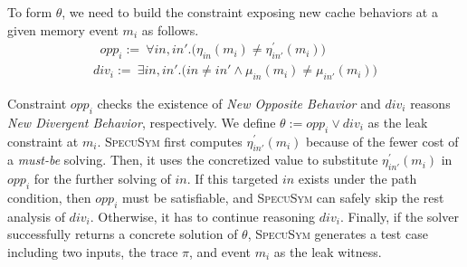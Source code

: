 \documentclass[sigconf,screen]{acmart}
\newcommand\ignore[1]{}
\newcommand{\SpecuSym}{\textsc{SpecuSym} }
\begin{document}
To form $\theta$, we need to build the constraint exposing new cache behaviors
at a given memory event $\mathit{m_i}$ as follows.
%
\begin{multline}
  \label{eqn:new_opp}
  ~~~~~~~
  \mathit{opp_i}:=~
  \forall\mathit{in,in'}.
  \big(
  \mathit{\eta_{in}(m_i)\neq\eta_{in'}^\prime(m_i)}
  \big)
  ~~~~~~~~~~~~~~~~~~~~~~~
\end{multline}
%
\begin{multline}
  \label{eqn:new_div}
  ~~~~~~~
  \mathit{div_i}:=~
  \exists\mathit{in,in'}.
  \big(
  \mathit{in\neq in'\wedge\mu_{in}(m_i) \neq \mu_{in'}(m_i)}
  \big)
  ~~~~~~~
\end{multline}
%
%
\ignore{
%
\begin{multline}
  \label{eqn:leak}
  ~~
  \theta:=
  \Big(
  \mathit{div_i}
  \wedge
  \big(
  \sum_{\scriptscriptstyle \mathit{k=0}}^{\scriptscriptstyle\mathit{n}} 
  \mathit{\eta_{in''}(m_k)=}0
  \neq
  \sum_{\scriptscriptstyle \mathit{k=0}}^{\scriptscriptstyle\mathit{n}} 
  \mathit{\eta_{in''}(m_k)=}1
  \big)
  \Big)
  \vee 
  \mathit{opp_i}
  ~~
\end{multline}
%
}
%
\ignore{
Note that 
speculative execution not only evicts cache lines to cause new misses but also loads 
memory data into cache that benefits new hits. Since a leak refers to the noticeable 
timing variance in program runs with and without speculative execution, from 
$\mathit{opp_i}$ the amount of new misses should differ from the amount of new hits. 
And we construct the final leak constraint $\theta$ on this observation:
}
%
%
Constraint $\mathit{opp_i}$ checks the existence of \textit{New Opposite Behavior}
and $\mathit{div_i}$ reasons \textit{New Divergent Behavior}, respectively. We 
define $\theta:=\mathit{opp_i}\vee\mathit{div_i}$ as the leak 
constraint at $\mathit{m_i}$. \SpecuSym first computes 
$\mathit{\eta_{in'}^\prime(m_i)}$ because of the fewer cost of a \textit{must-be} 
solving. Then, it uses the concretized value to substitute 
$\mathit{\eta_{in'}^\prime(m_i)}$ in $\mathit{opp_i}$ for the further solving
of $\mathit{in}$. If this targeted $\mathit{in}$ exists under the path condition, 
then $opp_i$ must be satisfiable, and \SpecuSym can safely skip the rest analysis 
of $\mathit{div_i}$. Otherwise, it has to continue reasoning $\mathit{div_i}$. 
Finally, if the solver successfully returns a concrete solution of $\theta$, 
\SpecuSym generates a test case including two inputs, the trace $\pi$, and event 
$\mathit{m_i}$ as the leak witness.
\end{document}
